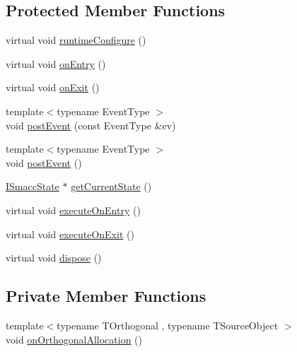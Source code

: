 \subsection*{Protected Member Functions}
\begin{DoxyCompactItemize}
\item 
virtual void \hyperlink{classsmacc_1_1ISmaccClientBehavior_a1078de57f291301cc2829c3548fa5ea5}{runtime\+Configure} ()
\item 
virtual void \hyperlink{classsmacc_1_1ISmaccClientBehavior_a9877684b1954429719826e2d0924d980}{on\+Entry} ()
\item 
virtual void \hyperlink{classsmacc_1_1ISmaccClientBehavior_ad1198fdb2cbdf11f3276d3e23d4c0a50}{on\+Exit} ()
\item 
{\footnotesize template$<$typename Event\+Type $>$ }\\void \hyperlink{classsmacc_1_1ISmaccClientBehavior_af8c7fc75e85d717ecee0dcd254f71681}{post\+Event} (const Event\+Type \&ev)
\item 
{\footnotesize template$<$typename Event\+Type $>$ }\\void \hyperlink{classsmacc_1_1ISmaccClientBehavior_a5db577c585935114058770f2b7242f8a}{post\+Event} ()
\item 
\hyperlink{classsmacc_1_1ISmaccState}{I\+Smacc\+State} $\ast$ \hyperlink{classsmacc_1_1ISmaccClientBehavior_a34fde34e48fa13db622ee60d8374d0b8}{get\+Current\+State} ()
\item 
virtual void \hyperlink{classsmacc_1_1ISmaccClientBehavior_a90b7032f7520f9e7e805835e6ed9d43e}{execute\+On\+Entry} ()
\item 
virtual void \hyperlink{classsmacc_1_1ISmaccClientBehavior_ac88fbad78c928b4bca6d18659ddfd8c0}{execute\+On\+Exit} ()
\item 
virtual void \hyperlink{classsmacc_1_1ISmaccClientBehavior_abdc74a8d95fdd02794c19dfa90f8a6ce}{dispose} ()
\end{DoxyCompactItemize}
\subsection*{Private Member Functions}
\begin{DoxyCompactItemize}
\item 
{\footnotesize template$<$typename T\+Orthogonal , typename T\+Source\+Object $>$ }\\void \hyperlink{classsmacc_1_1ISmaccClientBehavior_a6765b53cec4eb8c663cc8c2d63649ae4}{on\+Orthogonal\+Allocation} ()
\end{DoxyCompactItemize}
